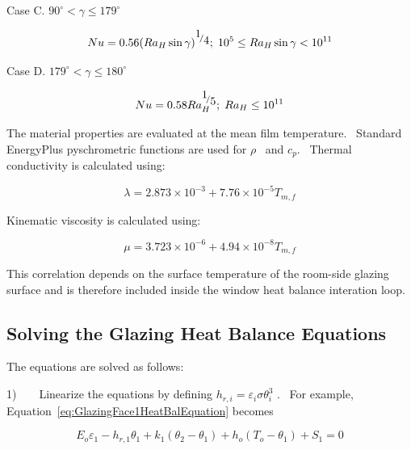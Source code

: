 Case C. \(90^\circ < \gamma \le 179^\circ\)

\begin{equation}
Nu = 0.56{\left( {R{a_H}\sin \gamma } \right)^{{\raise0.7ex\hbox{1} \!\mathord{\left/ {\vphantom {1 4}}\right.}\!\lower0.7ex\hbox{4}}}};\;{10^5} \le R{a_H}\sin \gamma  < {10^{11}}
\end{equation}

Case D. \(179^\circ < \gamma \le 180^\circ\)

\begin{equation}
Nu = 0.58Ra_H^{{\raise0.7ex\hbox{1} \!\mathord{\left/ {\vphantom {1 5}}\right.}\!\lower0.7ex\hbox{5}}};\;R{a_H} \le {10^{11}}
\end{equation}

The material properties are evaluated at the mean film temperature.~ Standard EnergyPlus pyschrometric functions are used for \(\rho\) ~and \({c_p}\).~ Thermal conductivity is calculated using:

\begin{equation}
\lambda = 2.873 \times {10^{ - 3}} + 7.76 \times {10^{ - 5}}{T_{m,f}}
\end{equation}

Kinematic viscosity is calculated using:

\begin{equation}
\mu = 3.723 \times {10^{ - 6}} + 4.94 \times {10^{ - 8}}{T_{m,f}}
\end{equation}

This correlation depends on the surface temperature of the room-side glazing surface and is therefore included inside the window heat balance interation loop.

\subsection{Solving the Glazing Heat Balance Equations}\label{solving-the-glazing-heat-balance-equations}

The equations are solved as follows:

1)~~~~Linearize the equations by defining \({h_{r,i}} = {\varepsilon_i}\sigma \theta_i^3\) .~ For example, Equation~\ref{eq:GlazingFace1HeatBalEquation} becomes

\begin{equation}
{E_o}{\varepsilon_1} - {h_{r,1}}{\theta_1} + {k_1}\left( {{\theta_2} - {\theta_1}} \right) + {h_o}\left( {{T_o} - {\theta_1}} \right) + {S_1} = 0
\end{equation}

